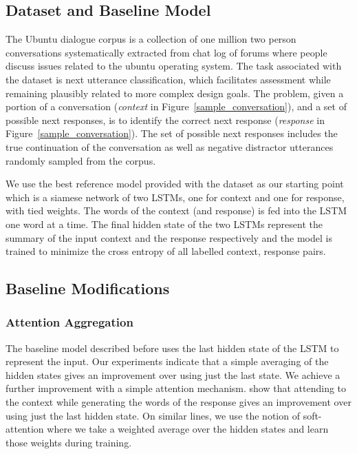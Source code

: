 \documentclass[11pt]{report}
\renewcommand\cite{\citep}	%
\begin{document}
\subsection{Dataset and Baseline Model}\label{dataset_baseline}

The Ubuntu dialogue corpus is a collection of one million two person conversations systematically extracted from chat log of forums where people discuss issues related to the ubuntu operating system. The task associated with the dataset is next utterance classification, which facilitates assessment while remaining plausibly related to more
complex design goals.  The problem, given a portion of a conversation (\textit{context} in Figure~\ref{sample_conversation}), and a set of possible next responses, is to identify the correct next response (\textit{response} in Figure~\ref{sample_conversation}).  The set of possible next responses includes the true continuation of the conversation as well as negative distractor utterances randomly sampled from the corpus.

We use the best reference model provided with the dataset as our starting point which is a siamese network of two LSTMs, one for context and one for response, with tied weights. The words of the context (and response) is fed into the LSTM one word at a time. The final hidden state of the two LSTMs represent the summary of the input context and the response respectively and the model is trained to minimize the cross entropy of all labelled context, response pairs.

\subsection{Baseline Modifications}\label{baseline_modifications}

\subsubsection{Attention Aggregation}

\noindent
The baseline model described before uses the last hidden state of the LSTM to represent the input. Our experiments indicate that a simple averaging of the hidden states gives an improvement over using just the last state. We achieve a further improvement with a simple attention mechanism. %
\cite{yao2016attentional} show that attending to the context while generating the words of the response gives an improvement over using just the last hidden state. On similar lines, we use the notion of soft-attention where we take a weighted average over the hidden states and learn those weights during training. 
\end{document}
